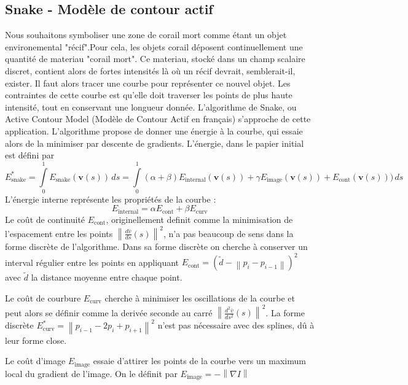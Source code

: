 \newcommand{\Esnake}{E_{\text{snake}}}
\newcommand{\Eintern}{E_{\text{internal}}}
\newcommand{\Eextern}{E_{\text{external}}}
\newcommand{\Econt}{E_{\text{cont}}}
\newcommand{\Eimage}{E_{\text{image}}}
\newcommand{\Ecurv}{E_{\text{curv}}}

\subsection{Snake - Modèle de contour actif}

Nous souhaitons symboliser une zone de corail mort comme étant un objet environemental "récif".Pour cela, les objets corail déposent continuellement une quantité de materiau "corail mort". Ce materiau, stocké dans un champ scalaire discret, contient alors de fortes intensités là où un récif devrait, semblerait-il, exister.
Il faut alors tracer une courbe pour représenter ce nouvel objet. Les contraintes de cette courbe est qu'elle doit traverser les points de plus haute intensité, tout en conservant une longueur donnée.
L'algorithme de Snake, ou Active Contour Model (Modèle de Contour Actif en français) s'approche de cette application. L'algorithme propose de donner une énergie à la courbe, qui essaie alors de la minimiser par descente de gradients.
L'énergie, dans le papier initial est défini  par 
$$
\Esnake^{*} = \int \limits _{0}^{1} \Esnake(\mathbf {v} (s))\,ds = \int \limits _{0}^{1} \left( \alpha + \beta \right) \Eintern (\mathbf {v} (s)) + \gamma \Eimage (\mathbf {v} (s)) + \Econt (\mathbf {v} (s)))\,ds
$$
L'énergie interne représente les propriétés de la courbe : 
$$
\Eintern = \alpha \Econt + \beta \Ecurv
$$
Le coût de continuité $\Econt$, originellement definit comme la minimisation de l'espacement entre les points $\left\|{\frac {d{\bar {v}}}{ds}}(s)\right\| ^{2}$, n'a pas beaucoup de sens dans la forme discrète de l'algorithme. Dans sa forme discrète on cherche à conserver un interval régulier entre les points en appliquant $\Econt = \left(\tilde{d} - \left\|p_i - p_{i-1} \right\| \right)^2$ avec $\tilde{d}$ la distance moyenne entre chaque point.

Le coût de courbure $\Ecurv$ cherche à minimiser les oscillations de la courbe et peut alors se définir comme la derivée seconde au carré $\left\|{\frac {d^{2}{\bar {v}}}{ds^{2}}}(s)\right\| ^{2}$.
La forme discrète $\Ecurv^{*} = \left\| p_{i-1} - 2 p_i + p_{i+1} \right\| ^2$ n'est pas nécessaire avec des splines, dû à leur forme close.

Le coût d'image $\Eimage$ essaie d'attirer les points de la courbe vers un maximum local du gradient de l'image. On le définit par $\Eimage = - \left\| \nabla I \right\| $

